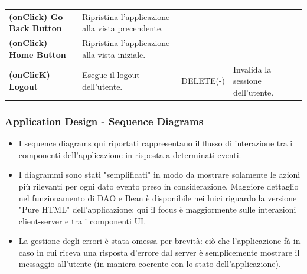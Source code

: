 \documentclass[aspectratio=169, dvipsnames]{beamer}
\begin{document}
\begin{frame}
\begin{table}[h!]
{\begin{tabular}{|ll|ll|}
                \multicolumn{1}{|l|}{\textbf{}}                         &                                                            & \multicolumn{1}{l|}{}                              &                                           \\ \hline
                \multicolumn{1}{|l|}{\textbf{(onClick) Go Back Button}} & Ripristina l'applicazione alla vista precendente.          & \multicolumn{1}{l|}{-}                             & -                                         \\ \hline
                \multicolumn{1}{|l|}{\textbf{(onClick) Home Button}}    & Ripristina l'applicazione alla vista iniziale.             & \multicolumn{1}{l|}{-}                             & -                                         \\ \hline
                \multicolumn{1}{|l|}{\textbf{(onClicK) Logout}}         & Esegue il logout dell'utente.                              & \multicolumn{1}{l|}{DELETE(-)}                     & Invalida la sessione dell'utente.         \\ \hline
            \end{tabular}
        }
    \end{table}
\end{frame}

\begin{frame}
    \frametitle{Application Design - Sequence Diagrams}
    \begin{itemize}
        \item I sequence diagrams qui riportati rappresentano il flusso di interazione tra i componenti
              dell'applicazione in risposta a determinati eventi.
        \item I diagrammi sono stati "semplificati" in modo da mostrare solamente le azioni più rilevanti per
              ogni dato evento preso in considerazione. Maggiore dettaglio nel funzionamento di DAO e Bean è
              disponibile nei luici riguardo la versione "Pure HTML" dell'applicazione; qui il focus è 
              maggiormente sulle interazioni client-server e tra i componenti UI.
        \item La gestione degli errori è stata omessa per brevità: ciò che l'applicazione fà in caso in cui
              riceva una risposta d'errore dal server è semplicemente mostrare il messaggio all'utente (in maniera
              coerente con lo stato dell'applicazione).
    \end{itemize}
\end{frame}
\end{document}
